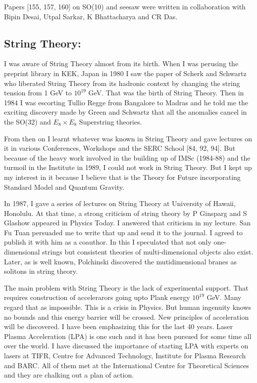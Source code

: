 Papers [155, 157, 160] on SO(10) and seesaw were written in collaboration 
with Bipin Desai, Utpal Sarkar, K Bhattacharya and CR Das.

\vspace{-\topsep}
\subsection*{String Theory:}

I was aware of String Theory almost from its birth. When I was perusing 
the preprint library in KEK, Japan in 1980 I saw the paper of Scherk and 
Schwartz who liberated String Theory from its hadronic context by 
changing the string tension from 1 GeV to $10^{19}$ GeV. That was the birth 
of String Theory. Then in 1984 I was escorting Tullio Regge from 
Bangalore to Madras and he told me the exciting discovery made by Green 
and Schwartz that all the anomalies cancel in the SO(32) and $E_8 \times E_8$ 
Superstring theories.

From then on I learnt whatever was known in String Theory and gave 
lectures on it in various Conferences, Workshops and the SERC School 
[84, 92, 94]. But because of the heavy work involved in the building up of 
IMSc (1984-88) and the turmoil in the Institute in 1989, I could not 
work in String Theory. But I kept up my interest in it because I believe 
that is the Theory for Future incorporating Standard Model and Quantum 
Gravity.

In 1987, I gave a series of lectures on String Theory at University of 
Hawaii, Honolulu. At that time, a strong criticism of string theory by P 
Ginsparg and S Glashow appeared in Physics Today. I answered that 
criticism in my lecture. San Fu Tuan persuaded me to write that up and 
send it to the journal. I agreed to publish it with him as a coauthor. 
In this I speculated that not only one-dimensional strings but 
consistent theories of multi-dimensional objects also exist. Later, as 
is well known, Polchinski discovered the mutidimensional branes as 
solitons in string theory.
\medskip

The main problem with String Theory is the lack of experi\-mental support. 
That requires construction of accelerarors going upto Plank energy $10^{19}$ 
GeV. Many regard that as impossible. This is a crisis in Physics. But 
human ingenuity knows no bounds and this energy barrier will be crossed. 
New principles of accele\-ration will be discovered. I have been 
emphasizing this for the last 40 years. Laser Plasma Acceleration (LPA) 
is one such and it has been pursued for some time all over the world. I 
have discussed the importance of starting LPA with experts on lasers at 
TIFR, Centre for Advanced Technology, Institute for Plasma Research and 
BARC. All of them met at the International Centre for Theoretical 
Sciences and they are chalking out a plan of action.


